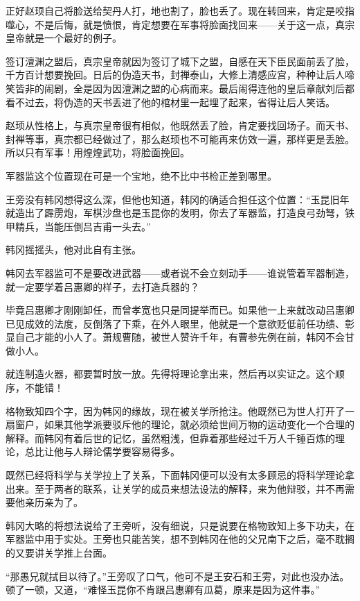 正好赵顼自己将脸送给契丹人打，地也割了，脸也丢了。现在转回来，肯定是咬指噬心，不是后悔，就是愤恨，肯定想要在军事将脸面找回来——关于这一点，真宗皇帝就是一个最好的例子。

签订澶渊之盟后，真宗皇帝就因为签订了城下之盟，自感在天下臣民面前丢了脸，千方百计想要挽回。日后的伪造天书，封禅泰山，大修上清感应宫，种种让后人啼笑皆非的闹剧，全是因为因澶渊之盟的心病而来。最后闹得连他的皇后章献刘后都看不过去，将伪造的天书丢进了他的棺材里一起埋了起来，省得让后人笑话。

赵顼从性格上，与真宗皇帝很有相似，他既然丢了脸，肯定要找回场子。而天书、封禅等事，真宗都已经做过了，那么赵顼也不可能再来仿效一遍，那样更是丢脸。所以只有军事！用煌煌武功，将脸面挽回。

军器监这个位置现在可是一个宝地，绝不比中书检正差到哪里。

王旁没有韩冈想得这么深，但他也知道，韩冈的确适合担任这个位置：“玉昆旧年就造出了霹雳炮，军棋沙盘也是玉昆你的发明，你去了军器监，打造良弓劲弩，铁甲精兵，当能压倒吕吉甫一头去。”

韩冈摇摇头，他对此自有主张。

韩冈去军器监可不是要改进武器——或者说不会立刻动手——谁说管着军器制造，就一定要学着吕惠卿的样子，去打造兵器的？

毕竟吕惠卿才刚刚卸任，而曾孝宽也只是同提举而已。如果他一上来就改动吕惠卿已见成效的法度，反倒落了下乘，在外人眼里，他就是一个意欲贬低前任功绩、彰显自己才能的小人了。萧规曹随，被世人赞许千年，有曹参先例在前，韩冈不会甘做小人。

就连制造火器，都要暂时放一放。先得将理论拿出来，然后再以实证之。这个顺序，不能错！

格物致知四个字，因为韩冈的缘故，现在被关学所抢注。他既然已为世人打开了一扇窗户，如果其他学派要驳斥他的理论，就必须给世间万物的运动变化一个合理的解释。而韩冈有着后世的记忆，虽然粗浅，但靠着那些经过千万人千锤百炼的理论，总比让他与人辩论儒学要容易得多。

既然已经将科学与关学拉上了关系，下面韩冈便可以没有太多顾忌的将科学理论拿出来。至于两者的联系，让关学的成员来想法设法的解释，来为他辩驳，并不再需要他亲历亲为了。

韩冈大略的将想法说给了王旁听，没有细说，只是说要在格物致知上多下功夫，在军器监中用于实处。王旁也只能苦笑，想不到韩冈在他的父兄南下之后，毫不耽搁的又要讲关学推上台面。

“那愚兄就拭目以待了。”王旁叹了口气，他可不是王安石和王雱，对此也没办法。顿了一顿，又道，“难怪玉昆你不肯跟吕惠卿有瓜葛，原来是因为这件事。”

